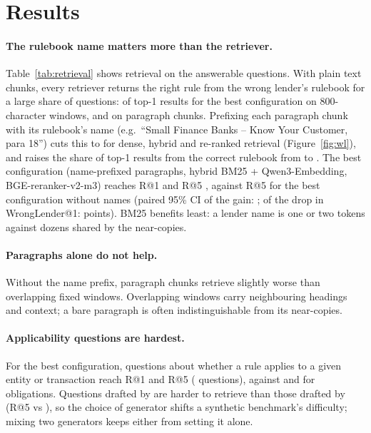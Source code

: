 \documentclass[11pt]{article}
\begin{document}
\section{Results}



\paragraph{The rulebook name matters more than the retriever.} Table~\ref{tab:retrieval} shows retrieval on the \NQuestions{} answerable questions. With plain text chunks, every retriever returns the right rule from the wrong lender's rulebook for a large share of questions: \FixedWL{} of top-1 results for the best configuration on 800-character windows, and \ParaWLRange{} on paragraph chunks. Prefixing each paragraph chunk with its rulebook's name (e.g.\ ``Small Finance Banks -- Know Your Customer, para 18'') cuts this to \TitleWLRange{} for dense, hybrid and re-ranked retrieval (Figure~\ref{fig:wl}), and raises the share of top-1 results from the correct rulebook from \FixedBook{} to \BestBook{}. The best configuration (name-prefixed paragraphs, hybrid BM25 + Qwen3-Embedding, BGE-reranker-v2-m3) reaches R@1 \BestRone{} and R@5 \BestRfive{}, against R@5 \FixedRfive{} for the best configuration without names (paired 95\% CI of the gain: \CIPrefixRfive{}; of the drop in WrongLender@1: \CIPrefixWL{} points). BM25 benefits least: a lender name is one or two tokens against dozens shared by the near-copies.

\paragraph{Paragraphs alone do not help.} Without the name prefix, paragraph chunks retrieve slightly worse than overlapping fixed windows. Overlapping windows carry neighbouring headings and context; a bare paragraph is often indistinguishable from its near-copies.

\paragraph{Applicability questions are hardest.} For the best configuration, questions about whether a rule applies to a given entity or transaction reach R@1 \AppRone{} and R@5 \AppRfive{} (\NApp{} questions), against \OblRone{} and \OblRfive{} for obligations. Questions drafted by \GenB{} are harder to retrieve than those drafted by \GenA{} (R@5 \GenBRfive{} vs \GenARfive{}), so the choice of generator shifts a synthetic benchmark's difficulty; mixing two generators keeps either from setting it alone.
\end{document}
